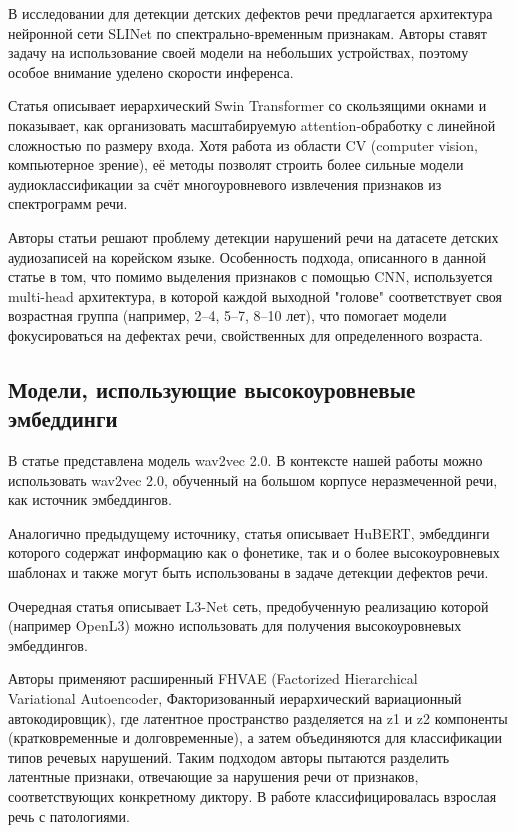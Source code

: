 \documentclass[a4paper,14pt]{extarticle}
\begin{document}
В исследовании \textbf{\cite{kaushik2021_slinet}} для детекции детских дефектов речи предлагается архитектура нейронной сети SLINet по спектрально-временным признакам. Авторы ставят задачу на использование своей модели на небольших устройствах, поэтому особое внимание уделено скорости инференса.

Статья \textbf{\cite{liu2021_swin_transformer}} описывает иерархический Swin Transformer со скользящими окнами и показывает, как организовать масштабируемую attention-обработку с линейной сложностью по размеру входа. Хотя работа из области CV (computer vision, компьютерное зрение), её методы позволят строить более сильные модели аудиоклассификации за счёт многоуровневого извлечения признаков из спектрограмм речи.

Авторы статьи \textbf{\cite{kim2024_ssd_age_bias}} решают проблему детекции нарушений речи на датасете детских аудиозаписей на корейском языке. Особенность подхода, описанного в данной статье в том, что помимо выделения признаков с помощью CNN, используется multi-head архитектура, в которой каждой выходной "голове" соответствует своя возрастная группа (например, 2–4, 5–7, 8–10 лет), что помогает модели фокусироваться на дефектах речи, свойственных для определенного возраста.

\subsection{Модели, использующие высокоуровневые эмбеддинги}

В статье \textbf{\cite{baevski2020_wav2vec2}} представлена модель wav2vec 2.0. В контексте нашей работы можно использовать wav2vec 2.0, обученный на большом корпусе неразмеченной речи, как источник эмбеддингов.

Аналогично предыдущему источнику, статья \textbf{\cite{hsu2021_hubert}} описывает HuBERT, эмбеддинги которого содержат информацию как о фонетике, так и о более высокоуровневых шаблонах и также могут быть использованы в задаче детекции дефектов речи. 

Очередная статья \textbf{\cite{cramer2019_openl3}} описывает L3-Net сеть, предобученную реализацию которой (например OpenL3) можно использовать для получения высокоуровневых эмбеддингов.

Авторы \textbf{\cite{qi2021_fhvae_disorder}} применяют расширенный FHVAE (Factorized Hierarchical \\ Variational Autoencoder, Факторизованный иерархический вариационный автокодировщик), где латентное пространство разделяется на z1 и z2 компоненты (кратковременные и долговременные), а затем объединяются для классификации типов речевых нарушений. Таким подходом авторы пытаются разделить латентные признаки, отвечающие за нарушения речи от признаков, соответствующих конкретному диктору. В работе классифицировалась взрослая речь с патологиями.
\end{document}
